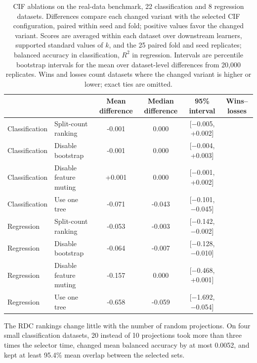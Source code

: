\begin{table}[!htbp]
  \centering
  \footnotesize
  \setlength{\tabcolsep}{4pt}
  \renewcommand{\arraystretch}{1.08}
  \begin{tabular}{@{}llS[table-format=+1.3]S[table-format=+1.3]cc@{}}
    \toprule
     &  & {Mean difference} & {Median difference} & 95\% interval & Wins--losses \\
    \midrule
    Classification & Split-count ranking & -0.001 & 0.000 & [$-$0.005, +0.002] &  \\
    Classification & Disable bootstrap & -0.001 & 0.000 & [$-$0.004, +0.003] &  \\
    Classification & Disable feature muting & +0.001 & 0.000 & [$-$0.001, +0.002] &  \\
    Classification & Use one tree & -0.071 & -0.043 & [$-$0.101, $-$0.045] &  \\
    \addlinespace
    Regression & Split-count ranking & -0.053 & -0.003 & [$-$0.142, $-$0.002] &  \\
    Regression & Disable bootstrap & -0.064 & -0.007 & [$-$0.128, $-$0.010] &  \\
    Regression & Disable feature muting & -0.157 & 0.000 & [$-$0.468, +0.001] &  \\
    Regression & Use one tree & -0.658 & -0.059 & [$-$1.692, $-$0.054] &  \\
    \bottomrule
  \end{tabular}
  \caption{CIF ablations on the real-data benchmark, 22 classification and 8
  regression datasets. Differences compare each changed variant with the
  selected CIF configuration, paired within seed and fold; positive values
  favor the changed variant. Scores are averaged within each dataset over
  downstream learners, supported standard values of $k$, and the 25 paired
  fold and seed replicates; balanced accuracy in classification, $R^2$ in
  regression. Intervals are percentile bootstrap intervals for the mean over
  dataset-level differences from 20{,}000 replicates. Wins and losses count datasets where
  the changed variant is higher or lower; exact ties are omitted.}
  \label{tab:cif-ranking-ablation}
\end{table}

The RDC rankings change little with the number of random projections. On four
small classification datasets, 20 instead of 10 projections took more than
three times the selector time, changed mean balanced accuracy by at most
0.0052, and kept at least 95.4\% mean overlap between the selected sets.

